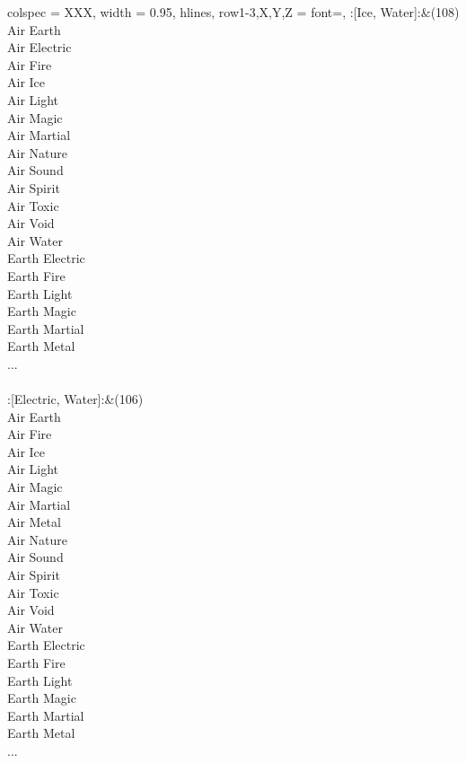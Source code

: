 \begin{longtblr}[
	caption = {2v2 Attacking Effective},
	label = {2v2-Attacking-Effective},
]{
	colspec = {XXX}, width = 0.95\linewidth,
	hlines,
	row{1-3,X,Y,Z} = {font=\bfseries},
}
	:[Ice, Water]:&{(108)\\
	Air Earth \\
	Air Electric \\
	Air Fire \\
	Air Ice \\
	Air Light \\
	Air Magic \\
	Air Martial \\
	Air Nature \\
	Air Sound \\
	Air Spirit \\
	Air Toxic \\
	Air Void \\
	Air Water \\
	Earth Electric \\
	Earth Fire \\
	Earth Light \\
	Earth Magic \\
	Earth Martial \\
	Earth Metal \\
	...\\
	}\\

	:[Electric, Water]:&{(106)\\
	Air Earth \\
	Air Fire \\
	Air Ice \\
	Air Light \\
	Air Magic \\
	Air Martial \\
	Air Metal \\
	Air Nature \\
	Air Sound \\
	Air Spirit \\
	Air Toxic \\
	Air Void \\
	Air Water \\
	Earth Electric \\
	Earth Fire \\
	Earth Light \\
	Earth Magic \\
	Earth Martial \\
	Earth Metal \\
	...\\
	}\\


\end{longtblr}
